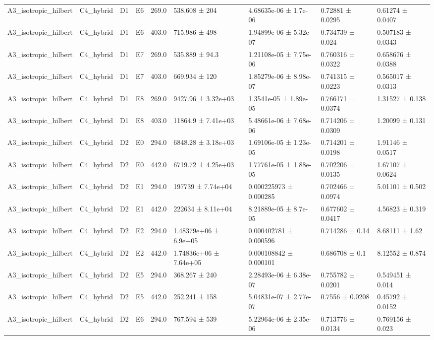 \begin{table}
\begin{tabular}{lllllllll}
A3\_isotropic\_hilbert & C4\_hybrid & D1 & E6 & 269.0 & 538.608 ± 204 & 4.68635e-06 ± 1.7e-06 & 0.72881 ± 0.0295 & 0.61274 ± 0.0407 \\
A3\_isotropic\_hilbert & C4\_hybrid & D1 & E6 & 403.0 & 715.986 ± 498 & 1.94899e-06 ± 5.32e-07 & 0.734739 ± 0.024 & 0.507183 ± 0.0343 \\
A3\_isotropic\_hilbert & C4\_hybrid & D1 & E7 & 269.0 & 535.889 ± 94.3 & 1.21108e-05 ± 7.75e-06 & 0.760316 ± 0.0322 & 0.658676 ± 0.0388 \\
A3\_isotropic\_hilbert & C4\_hybrid & D1 & E7 & 403.0 & 669.934 ± 120 & 1.85279e-06 ± 8.98e-07 & 0.741315 ± 0.0223 & 0.565017 ± 0.0313 \\
A3\_isotropic\_hilbert & C4\_hybrid & D1 & E8 & 269.0 & 9427.96 ± 3.32e+03 & 1.3541e-05 ± 1.89e-05 & 0.766171 ± 0.0374 & 1.31527 ± 0.138 \\
A3\_isotropic\_hilbert & C4\_hybrid & D1 & E8 & 403.0 & 11864.9 ± 7.41e+03 & 5.48661e-06 ± 7.68e-06 & 0.714206 ± 0.0309 & 1.20099 ± 0.131 \\
A3\_isotropic\_hilbert & C4\_hybrid & D2 & E0 & 294.0 & 6848.28 ± 3.18e+03 & 1.69106e-05 ± 1.23e-05 & 0.714201 ± 0.0198 & 1.91146 ± 0.0517 \\
A3\_isotropic\_hilbert & C4\_hybrid & D2 & E0 & 442.0 & 6719.72 ± 4.25e+03 & 1.77761e-05 ± 1.88e-05 & 0.702206 ± 0.0135 & 1.67107 ± 0.0624 \\
A3\_isotropic\_hilbert & C4\_hybrid & D2 & E1 & 294.0 & 197739 ± 7.74e+04 & 0.000225973 ± 0.000285 & 0.702466 ± 0.0974 & 5.01101 ± 0.502 \\
A3\_isotropic\_hilbert & C4\_hybrid & D2 & E1 & 442.0 & 222634 ± 8.11e+04 & 8.21889e-05 ± 8.7e-05 & 0.677602 ± 0.0417 & 4.56823 ± 0.319 \\
A3\_isotropic\_hilbert & C4\_hybrid & D2 & E2 & 294.0 & 1.48379e+06 ± 6.9e+05 & 0.000402781 ± 0.000596 & 0.714286 ± 0.14 & 8.68111 ± 1.62 \\
A3\_isotropic\_hilbert & C4\_hybrid & D2 & E2 & 442.0 & 1.74836e+06 ± 7.64e+05 & 0.000108842 ± 0.000101 & 0.686708 ± 0.1 & 8.12552 ± 0.874 \\
A3\_isotropic\_hilbert & C4\_hybrid & D2 & E5 & 294.0 & 368.267 ± 240 & 2.28493e-06 ± 6.38e-07 & 0.755782 ± 0.0201 & 0.549451 ± 0.014 \\
A3\_isotropic\_hilbert & C4\_hybrid & D2 & E5 & 442.0 & 252.241 ± 158 & 5.04831e-07 ± 2.77e-07 & 0.7556 ± 0.0208 & 0.45792 ± 0.0152 \\
A3\_isotropic\_hilbert & C4\_hybrid & D2 & E6 & 294.0 & 767.594 ± 539 & 5.22964e-06 ± 2.35e-06 & 0.713776 ± 0.0134 & 0.769156 ± 0.023 \\

\end{tabular}
\end{table}
